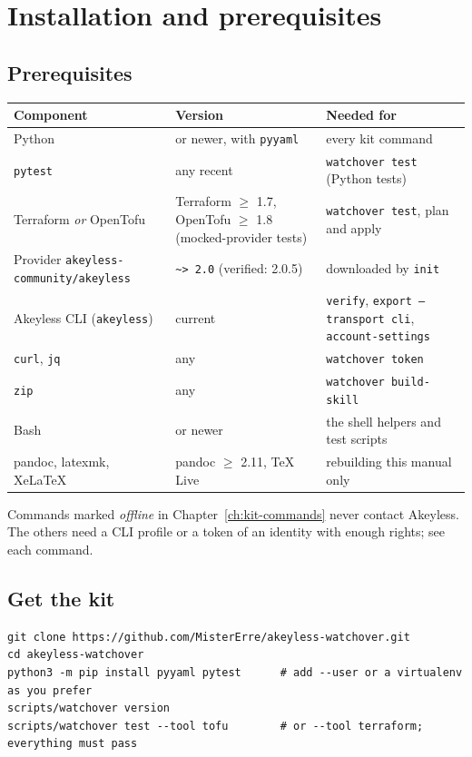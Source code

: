 \chapter{Installation and prerequisites}\label{ch:installation}

\section{Prerequisites}
\begin{center}\small
\begin{tabularx}{\linewidth}{@{}l>{\raggedright\arraybackslash}X>{\raggedright\arraybackslash}X@{}}
\toprule
\textbf{Component} & \textbf{Version} & \textbf{Needed for} \\ \midrule
Python & 3.10 or newer, with \texttt{pyyaml} & every kit command \\
\texttt{pytest} & any recent & \texttt{watchover test} (Python tests) \\
Terraform \emph{or} OpenTofu & Terraform $\geq$ 1.7, OpenTofu $\geq$ 1.8 (mocked-provider tests) & \texttt{watchover test}, plan and apply \\
Provider \texttt{akeyless-community/akeyless} & \texttt{\textasciitilde> 2.0} (verified: 2.0.5) & downloaded by \texttt{init} \\
Akeyless CLI (\texttt{akeyless}) & current & \texttt{verify}, \texttt{export --transport cli}, \texttt{account-settings} \\
\texttt{curl}, \texttt{jq} & any & \texttt{watchover token} \\
\texttt{zip} & any & \texttt{watchover build-skill} \\
Bash & 4 or newer & the shell helpers and test scripts \\
pandoc, latexmk, XeLaTeX & pandoc $\geq$ 2.11, TeX Live & rebuilding this manual only \\
\bottomrule
\end{tabularx}
\end{center}

Commands marked \emph{offline} in Chapter~\ref{ch:kit-commands} never contact Akeyless. The others
need a CLI profile or a token of an identity with enough rights; see each command.

\section{Get the kit}
\begin{lstlisting}
git clone https://github.com/MisterErre/akeyless-watchover.git
cd akeyless-watchover
python3 -m pip install pyyaml pytest      # add --user or a virtualenv as you prefer
scripts/watchover version
scripts/watchover test --tool tofu        # or --tool terraform; everything must pass
\end{lstlisting}


